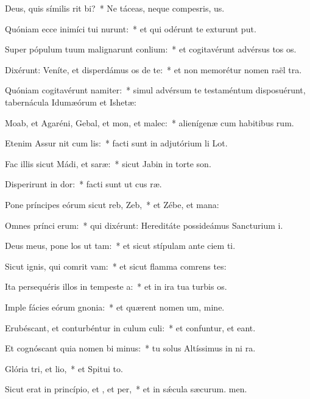 \item Deus, quis símilis rit bi?~* Ne táceas, neque compesris, us.
\item Quóniam ecce inimíci tui nurunt:~* et qui odérunt te exturunt put.
\item Super pópulum tuum malignarunt conlium:~* et cogitavérunt advérsus tos os.
\item Dixérunt: Veníte, et disperdámus os de te:~* et non memorétur nomen raël tra.
\item Quóniam cogitavérunt namiter:~* simul advérsum te testaméntum disposuérunt, tabernácula Idumæórum et Ishetæ:
\item Moab, et Agaréni, Gebal, et mon, et malec:~* alienígenæ cum habitibus rum.
\item Etenim Assur nit cum lis:~* facti sunt in adjutórium li Lot.
\item Fac illis sicut Mádi, et saræ:~* sicut Jabin in torte son.
\item Disperirunt in dor:~* facti sunt ut cus ræ.
\item Pone príncipes eórum sicut reb,  Zeb,~* et Zébe, et mana:
\item Omnes prínci erum:~* qui dixérunt: Hereditáte possideámus Sancturium i.
\item Deus meus, pone los ut tam:~* et sicut stípulam ante ciem ti.
\item Sicut ignis, qui comrit vam:~* et sicut flamma comrens tes:
\item Ita persequéris illos in tempeste a:~* et in ira tua turbis os.
\item Imple fácies eórum gnonia:~* et quærent nomen um, mine.
\item Erubéscant, et conturbéntur in culum culi:~* et confuntur, et eant.
\item Et cognóscant quia nomen bi minus:~* tu solus Altíssimus in ni ra.
\item Glória tri, et lio,~* et Spitui to.
\item Sicut erat in princípio, et , et per,~* et in sǽcula sæcurum. men.
